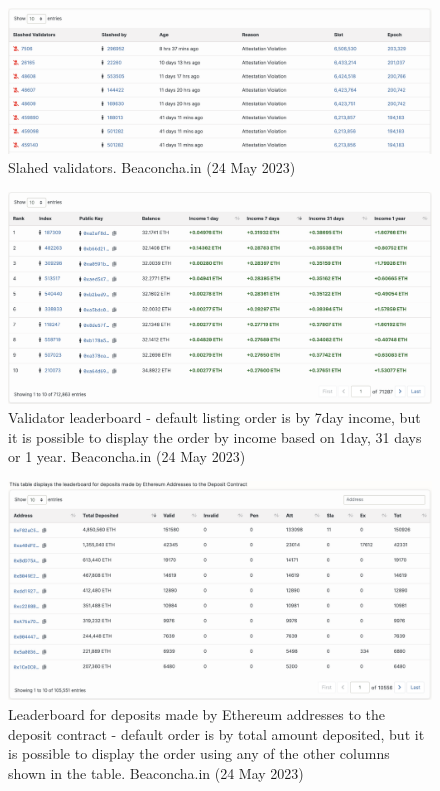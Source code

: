 \documentclass[UTF8]{article}
\begin{document}
\begin{figure}[htbp]
\begin{center}
\includegraphics[width=0.9\linewidth]{images/bslashed}
\caption{Slahed validators. Beaconcha.in (24 May 2023)}
\label{fig:bslashed}
\end{center}
\end{figure}

\begin{figure}[htbp]
\begin{center}
\includegraphics[width=0.9\linewidth]{images/bvalleader}
\caption{Validator leaderboard - default listing order is by 7day income, but it is possible to display the order by income based on 1day, 31 days or 1 year. Beaconcha.in (24 May 2023)}
\label{fig:bvalleader}
\end{center}
\end{figure}

\begin{figure}[htbp]
\begin{center}
\includegraphics[width=0.9\linewidth]{images/bdepleadtbl}
\caption{Leaderboard for deposits made by Ethereum addresses to the deposit contract - default order is by total amount deposited, but it is possible to display the order using any of the other columns shown in the table. Beaconcha.in (24 May 2023)}
\label{fig:bdepleadtbl}
\end{center}
\end{figure}
\end{document}
